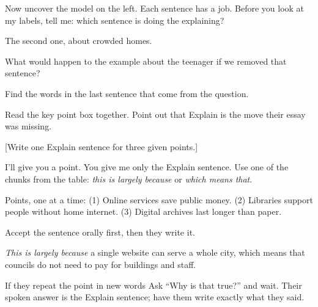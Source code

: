 \documentclass{tutordesk}
\begin{document}
\begin{say}
Now uncover the model on the left. Each sentence has a job. Before you look at my labels,
tell me: which sentence is doing the explaining?
\end{say}

\begin{expect}
  \item The second one, about crowded homes.
\end{expect}

\begin{probe}
  \item What would happen to the example about the teenager if we removed that sentence?
  \item Find the words in the last sentence that come from the question.
\end{probe}

\begin{action}
  \item Read the key point box together. Point out that Explain is the move their essay was missing.
\end{action}

[Write one Explain sentence for three given points.]

\begin{say}
I'll give you a point. You give me only the Explain sentence. Use one of the chunks from the
table: \emph{this is largely because} or \emph{which means that}.
\end{say}

\begin{action}
  \item Points, one at a time: (1) Online services save public money. (2) Libraries support
        people without home internet. (3) Digital archives last longer than paper.
  \item Accept the sentence orally first, then they write it.
\end{action}

\begin{expect}
  \item \emph{This is largely because} a single website can serve a whole city, which means
        that councils do not need to pay for buildings and staff.
\end{expect}

\begin{fallback}{If they repeat the point in new words}
Ask \enquote{Why is that true?} and wait. Their spoken answer is the Explain sentence; have them
write exactly what they said.
\end{fallback}
\end{document}
